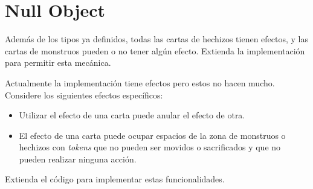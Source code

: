 \section{Null Object}
  \begin{Exercise}[title={Efectos}, label={ex:null-1}]
    Además de los tipos ya definidos, todas las cartas de hechizos tienen efectos, y las 
    cartas de monstruos pueden o no tener algún efecto.
    Extienda la implementación para permitir esta mecánica.
  \end{Exercise}

  \begin{Exercise}[title={Efectos específicos (Propuesto)}, label={ex:null-2}]
    Actualmente la implementación tiene efectos pero estos no hacen mucho.
    Considere los siguientes efectos específicos:
    \begin{itemize}
      \item Utilizar el efecto de una carta puede anular el efecto de otra.
      \item El efecto de una carta puede ocupar espacios de la zona de monstruos o 
        hechizos con \textit{tokens} que no pueden ser movidos o sacrificados y que no 
        pueden realizar ninguna acción.
    \end{itemize}

    Extienda el código para implementar estas funcionalidades.
  \end{Exercise}
%